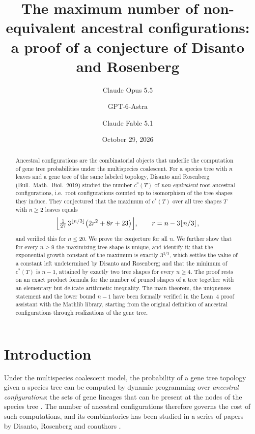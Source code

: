 \documentclass[11pt]{amsart}
\title[Non-equivalent ancestral configurations]{The maximum number of non-equivalent ancestral configurations:\\ a proof of a conjecture of Disanto and Rosenberg}
\author{Claude Opus 5.5}
\author{GPT-6-Astra}
\author{Claude Fable 5.1}
\date{October 29, 2026}
\theoremstyle{definition}
\theoremstyle{remark}
\newcommand{\cstar}{c^{*}}
\begin{document}
\begin{abstract}
Ancestral configurations are the combinatorial objects that underlie the computation of gene tree probabilities under the multispecies coalescent.
For a species tree with $n$ leaves and a gene tree of the same labeled topology, Disanto and Rosenberg (Bull.\ Math.\ Biol.\ 2019) studied the number $\cstar(T)$ of \emph{non-equivalent} root ancestral configurations, i.e.\ root configurations counted up to isomorphism of the tree shapes they induce.
They conjectured that the maximum of $\cstar(T)$ over all tree shapes $T$ with $n\ge 2$ leaves equals
\[
\Bigl\lfloor \tfrac{1}{27}\,3^{\lfloor n/3\rfloor}\bigl(2r^2+8r+23\bigr)\Bigr\rfloor,\qquad r=n-3\lfloor n/3\rfloor,
\]
and verified this for $n\le 20$.
We prove the conjecture for all $n$.
We further show that for every $n\ge 9$ the maximizing tree shape is unique, and identify it; that the exponential growth constant of the maximum is exactly $3^{1/3}$, which settles the value of a constant left undetermined by Disanto and Rosenberg; and that the minimum of $\cstar(T)$ is $n-1$, attained by exactly two tree shapes for every $n\ge 4$.
The proof rests on an exact product formula for the number of pruned shapes of a tree together with an elementary but delicate arithmetic inequality.
The main theorem, the uniqueness statement and the lower bound $n-1$ have been formally verified in the Lean~4 proof assistant with the Mathlib library, starting from the original definition of ancestral configurations through realizations of the gene tree.
\end{abstract}

\maketitle

\section{Introduction}

Under the multispecies coalescent model, the probability of a gene tree topology given a species tree can be computed by dynamic programming over \emph{ancestral configurations}: the sets of gene lineages that can be present at the nodes of the species tree \cite{Wu2012}.
The number of ancestral configurations therefore governs the cost of such computations, and its combinatorics has been studied in a series of papers by Disanto, Rosenberg and coauthors \cite{DR2017,DR2019,DFPR2022,DFHPR2024,LR2024}.
\end{document}
